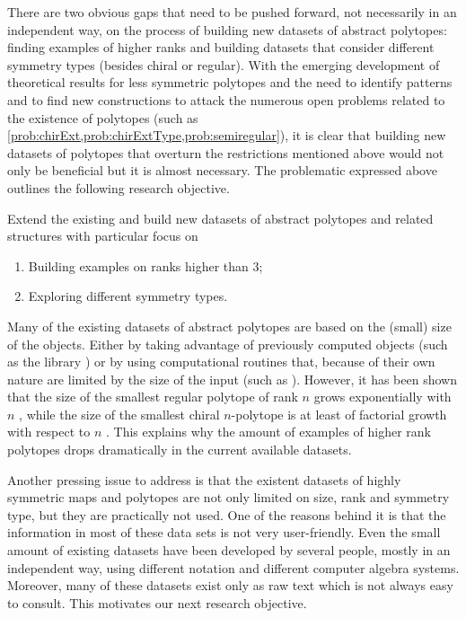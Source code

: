 \documentclass[a4paper,12pt,english]{article}
\begin{document}
There are two obvious gaps that need to be pushed forward, not necessarily in an independent way, on the process of building new datasets of abstract polytopes: finding examples of higher ranks and building datasets that consider different symmetry types (besides chiral or regular).
With the emerging development of theoretical results for less symmetric polytopes and the need to identify patterns and to find new constructions to attack the numerous open problems related to the existence of polytopes (such as \cref{prob:chirExt,prob:chirExtType,prob:semiregular}), it is clear that building new datasets of polytopes that overturn the restrictions mentioned above would not only be beneficial but it is almost necessary.
The problematic expressed above outlines the following research objective.

\begin{obj}\label{obj:datasets}
  Extend the existing and build new datasets of abstract polytopes and related structures with particular focus on
  \begin{enumerate}[label=\textit{(\roman*)}, noitemsep]
    \item Building examples on ranks higher than $3$;
    \item Exploring different symmetry types.
  \end{enumerate}
\end{obj}

Many of the existing datasets of abstract polytopes are based on the (small) size of the objects.
Either by taking advantage of previously computed objects (such as the library \smallgrp{}) or by using computational routines that, because of their own nature are limited by the size of the input (such as  \lins).
However, it has been shown that the size of the smallest regular polytope of rank $n$ grows exponentially with $n$ \cite{Conder2013_SmallestRegularPolytopes}, while the size of the smallest chiral $n$-polytope is at least of factorial growth with respect to $n$ \cite{Cunningham2017_NonFlatRegular}.
This explains why the amount of examples of higher rank polytopes drops dramatically in the current available datasets.

Another pressing issue to address is that the existent datasets of highly symmetric maps and polytopes are not only limited on size, rank and symmetry type, but they are practically not used.
One of the reasons behind it is that the information in most of these data sets is not very user-friendly.
Even the small amount of existing datasets have been developed by several people, mostly in an independent way, using different notation and different computer algebra systems.
Moreover, many of these datasets exist only as raw text which is not always easy to consult.
This motivates our next research objective.
\end{document}
